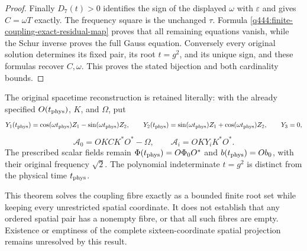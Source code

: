 \begin{proof}
Finally $D_7(t)>0$ identifies the sign of the displayed $\omega$ with
$\varepsilon$ and gives $C=\omega T$ exactly. The frequency square is
the unchanged $\tau$. Formula
\eqref{q444:finite-coupling-exact-residual-map} proves that all remaining
equations vanish, while the Schur inverse proves the full Gauss equation.
Conversely every original solution determines its fixed pair, its root
$t=g^2$, and its unique sign, and these formulas recover $C,\omega$.
This proves the stated bijection and both cardinality bounds.
\end{proof}

The original spacetime reconstruction is retained literally: with the
already specified $O(t_{\rm phys})$, $K$, and $\Omega$, put
\[
 Y_1(t_{\rm phys})=\cos(\omega t_{\rm phys})Z_1
                         -\sin(\omega t_{\rm phys})Z_2,\qquad
 Y_2(t_{\rm phys})=\sin(\omega t_{\rm phys})Z_1
                         +\cos(\omega t_{\rm phys})Z_2,\qquad Y_3=0,
\]
\[
 \mathcal A_0=OKCK^*O^*-\Omega,\qquad
 \mathcal A_i=OKY_iK^*O^*.
\]
The prescribed scalar fields remain
$\Phi(t_{\rm phys})=O\Phi_0O^*$ and $b(t_{\rm phys})=Ob_0$, with their
original frequency $\sqrt2$. The polynomial indeterminate $t=g^2$ is
distinct from the physical time $t_{\rm phys}$.

This theorem solves the coupling fibre exactly as a bounded finite root
set while keeping every unrestricted spatial coordinate. It does not
establish that any ordered spatial pair has a nonempty fibre, or that
all such fibres are empty. Existence or emptiness of the complete
sixteen-coordinate spatial projection remains unresolved by this result.
